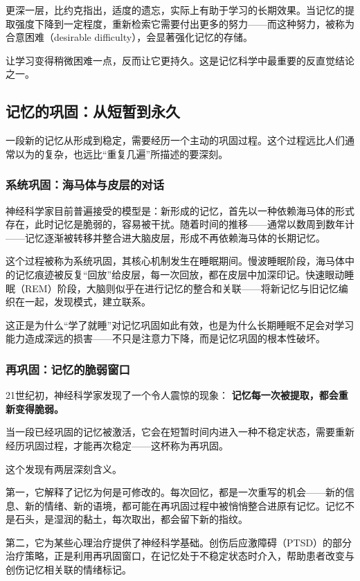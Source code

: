 \documentclass[11pt]{article}
\begin{document}
更深一层，比约克指出，适度的遗忘，实际上有助于学习的长期效果。当记忆的提取强度下降到一定程度，重新检索它需要付出更多的努力——而这种努力，被称为合意困难（desirable difficulty），会显著强化记忆的存储。

让学习变得稍微困难一点，反而让它更持久。这是记忆科学中最重要的反直觉结论之一。
\subsection{记忆的巩固：从短暂到永久}
\label{sec:org0c9b067}

一段新的记忆从形成到稳定，需要经历一个主动的巩固过程。这个过程远比人们通常以为的复杂，也远比“重复几遍”所描述的要深刻。
\subsubsection{系统巩固：海马体与皮层的对话}
\label{sec:orgba99a70}

神经科学家目前普遍接受的模型是：新形成的记忆，首先以一种依赖海马体的形式存在，此时记忆是脆弱的，容易被干扰。随着时间的推移——通常以数周到数年计——记忆逐渐被转移并整合进大脑皮层，形成不再依赖海马体的长期记忆。

这个过程被称为系统巩固，其核心机制发生在睡眠期间。慢波睡眠阶段，海马体中的记忆痕迹被反复“回放”给皮层，每一次回放，都在皮层中加深印记。快速眼动睡眠（REM）阶段，大脑则似乎在进行记忆的整合和关联——将新记忆与旧记忆编织在一起，发现模式，建立联系。

这正是为什么“学了就睡”对记忆巩固如此有效，也是为什么长期睡眠不足会对学习能力造成深远的损害——不只是注意力下降，而是记忆巩固的根本性破坏。
\subsubsection{再巩固：记忆的脆弱窗口}
\label{sec:org8567120}

21世纪初，神经科学家发现了一个令人震惊的现象： \textbf{记忆每一次被提取，都会重新变得脆弱。}

当一段已经巩固的记忆被激活，它会在短暂时间内进入一种不稳定状态，需要重新经历巩固过程，才能再次稳定——这杯称为再巩固。

这个发现有两层深刻含义。

第一，它解释了记忆为何是可修改的。每次回忆，都是一次重写的机会——新的信息、新的情绪、新的语境，都可能在再巩固过程中被悄悄整合进原有记忆。记忆不是石头，是湿润的黏土，每次取出，都会留下新的指纹。

第二，它为某些心理治疗提供了神经科学基础。创伤后应激障碍（PTSD）的部分治疗策略，正是利用再巩固窗口，在记忆处于不稳定状态时介入，帮助患者改变与创伤记忆相关联的情绪标记。
\end{document}
